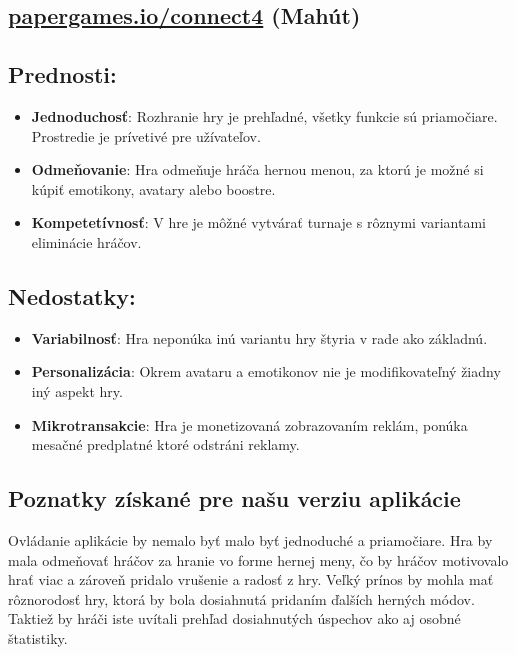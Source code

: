 \documentclass[a4paper, 11pt, onecolumn]{article}
\begin{document}
\subsection{ \href{https://papergames.io/en/connect4}{papergames.io/connect4} (Mahút)}

\subsection*{Prednosti:}
\begin{itemize}
  \item \textbf{Jednoduchosť}: Rozhranie hry je prehľadné, všetky funkcie sú priamočiare. Prostredie je prívetivé pre užívateľov.
  \item \textbf{Odmeňovanie}: Hra odmeňuje hráča hernou menou, za ktorú je možné si kúpiť emotikony, avatary alebo boostre.
  \item \textbf{Kompetetívnosť}: V hre je môžné vytvárať turnaje s rôznymi variantami eliminácie hráčov.
\end{itemize}
\subsection*{Nedostatky:}
\begin{itemize}
  \item \textbf{Variabilnosť}: Hra neponúka inú variantu hry štyria v rade ako základnú.
  \item \textbf{Personalizácia}: Okrem avataru a emotikonov nie je modifikovateľný žiadny iný aspekt hry.
  \item \textbf{Mikrotransakcie}: Hra je monetizovaná zobrazovaním reklám, ponúka mesačné predplatné ktoré odstráni reklamy.
\end{itemize}
\subsection*{Poznatky získané pre našu verziu aplikácie}
Ovládanie aplikácie by nemalo byť malo byť jednoduché a priamočiare. Hra by mala odmeňovať hráčov za hranie vo forme 
hernej meny, čo by hráčov motivovalo hrať viac a zároveň pridalo vrušenie a radosť z hry. Veľký prínos by mohla mať rôznorodosť hry, 
ktorá by bola dosiahnutá pridaním ďalších herných módov. Taktiež by hráči iste uvítali prehľad dosiahnutých úspechov ako aj osobné štatistiky.
\end{document}
